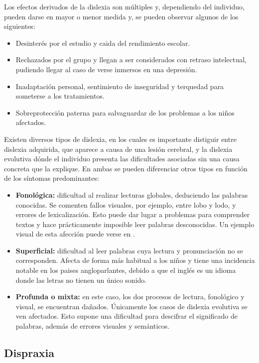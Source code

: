 Los efectos derivados de la dislexia son múltiples y, dependiendo del individuo, pueden darse en mayor o menor medida y, se pueden observar algunos de los siguientes:
\begin{itemize}
    \item Desinterés por el estudio y caida del rendimiento escolar.
    \item Rechazados por el grupo y llegan a ser considerados con retraso intelectual, pudiendo llegar al caso de verse inmersos en una depresión.
    \item Inadaptación personal, sentimiento de inseguridad y terquedad para someterse a los tratamientos.
    \item Sobreprotección paterna para salvaguardar de los problemas a los niños afectados.
\end{itemize}

Existen diversos tipos de dislexia, en los cuales es importante distiguir entre dislexia adquirida, que aparece a causa de una lesión cerebral, y la dislexia evolutiva dónde el individuo presenta las dificultades asociadas sin una causa concreta que la explique. En ambas se pueden diferenciar otros tipos \cite{WebConsultas} en función de los síntomas predominantes:
\begin{itemize}
    \item \textbf{Fonológica:} dificultad al realizar lecturas globales, deduciendo las palabras conocidas. Se comenten fallos visuales, por ejemplo, entre lobo y lodo, y errores de lexicalización. Esto puede dar lugar a problemas para comprender textos y hace prácticamente imposible leer palabras desconocidas. Un ejemplo visual de esta afección puede verse en \cite{GitDislexia}.
    \item \textbf{Superficial:} dificultad al leer palabras cuya lectura y pronunciación no se corresponden. Afecta de forma más habitual a los niños y tiene una incidencia notable en los paises angloparlantes, debido a que el inglés es un idioma donde las letras no tienen un único sonido.  
    \item \textbf{Profunda o mixta:} en este caso, los dos procesos de lectura, fonológico y visual, se encuentran dañados. Únicamente los casos de dislexia evolutiva se ven afectados. Esto supone una dificultad para descifrar el significado de palabras, además de errores visuales y semánticos.
\end{itemize}


\subsection{Dispraxia}
